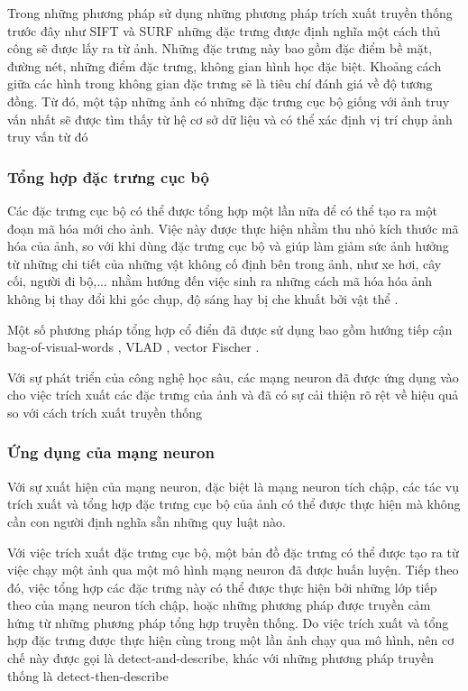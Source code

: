 Trong những phương pháp sử dụng những phương pháp trích xuất truyền thống trước đây như SIFT \cite{lowe2004distinctive} và SURF \cite{bay2006surf} những đặc trưng được định nghĩa một cách thủ công sẽ được lấy ra từ ảnh. Những đặc trưng này bao gồm đặc điểm bề mặt, đường nét, những điểm đặc trưng, không gian hình học đặc biệt. Khoảng cách giữa các hình trong không gian đặc trưng sẽ là tiêu chí đánh giá về độ tương đồng. Từ đó, một tập những ảnh có những đặc trưng cục bộ giống với ảnh truy vấn nhất sẽ được tìm thấy từ hệ cơ sở dữ liệu và có thể xác định vị trí chụp ảnh truy vấn từ đó \cite{pion2020benchmarking}
\subsubsection*{Tổng hợp đặc trưng cục bộ}
Các đặc trưng cục bộ có thể được tổng hợp một lần nữa để có thể tạo ra một đoạn mã hóa mới cho ảnh. Việc này được thực hiện nhằm thu nhỏ kích thước mã hóa của ảnh, so với khi dùng đặc trưng cục bộ và giúp làm giảm sức ảnh hưởng từ những chi tiết của những vật không cố định bên trong ảnh, như xe hơi, cây cối, người đi bộ,... nhằm hướng đến việc sinh ra những cách mã hóa hóa ảnh không bị thay đổi khi góc chụp, độ sáng hay bị che khuất bởi vật thể \cite{jegou2010aggregating}.

Một số phương pháp tổng hợp cổ điển đã được sử dụng bao gồm hướng tiếp cận bag-of-visual-words \cite{philbin2007object}, VLAD \cite{jegou2010aggregating}, vector Fischer \cite{jegou2011aggregating}.

Với sự phát triển của công nghệ học sâu, các mạng neuron đã được ứng dụng vào cho việc trích xuất các đặc trưng của ảnh và đã có sự cải thiện rõ rệt về hiệu quả \cite{sunderhauf2015performance} so với cách trích xuất truyền thống
\subsubsection*{Ứng dụng của mạng neuron}

Với sự xuất hiện của mạng neuron, đặc biệt là mạng neuron tích chập, các tác vụ trích xuất và tổng hợp đặc trưng cục bộ của ảnh có thể được thực hiện mà không cần con người định nghĩa sẵn những quy luật nào.

Với việc trích xuất đặc trưng cục bộ, một bản đồ đặc trưng có thể được tạo ra từ việc chạy một ảnh qua một mô hình mạng neuron đã được huấn luyện. Tiếp theo đó, việc tổng hợp các đặc trưng này có thể được thực hiện bởi những lớp tiếp theo của mạng neuron tích chập, hoặc những phương pháp được truyền cảm hứng từ những phương pháp tổng hợp truyền thống. Do việc trích xuất và tổng hợp đặc trưng được thực hiện cùng trong một lần ảnh chạy qua mô hình, nên cơ chế này được gọi là detect-and-describe, khác với những phương pháp truyền thống là detect-then-describe \cite{9373578}

